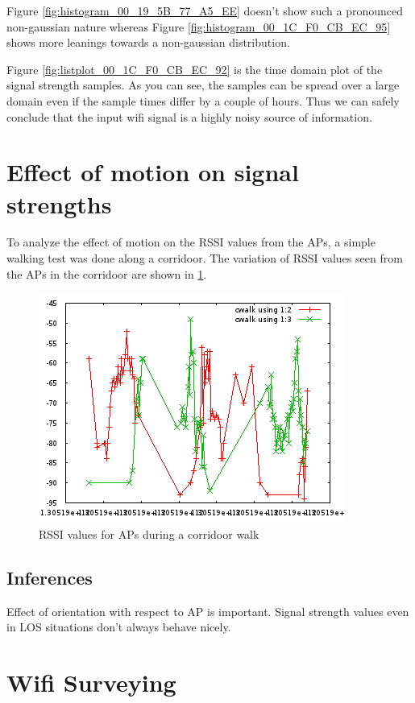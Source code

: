 Figure \ref{fig:histogram_00_19_5B_77_A5_EE} doesn't show such a pronounced non-gaussian
nature whereas Figure \ref{fig:histogram_00_1C_F0_CB_EC_95} shows more leanings towards a
non-gaussian distribution.

Figure \ref{fig:listplot_00_1C_F0_CB_EC_92} is the time domain plot of the signal strength
samples. As you can see, the samples can be spread over a large domain even if the 
sample times differ by a couple of hours. Thus we can safely conclude that the 
input wifi signal is a highly noisy source of information.

\section{Effect of motion on signal strengths}

To analyze the effect of motion on the RSSI values from the APs, a simple walking
test was done along a corridoor. The variation of RSSI values seen from the APs in
the corridoor are shown in \ref{fig:wifi_corridoor_walk}.

\begin{figure}\centering
    \includegraphics{figures/wifi_corridoor_walk.png}
    \caption{RSSI values for APs during a corridoor walk \label{fig:wifi_corridoor_walk}}
\end{figure}


\subsection{Inferences}
Effect of orientation with respect to AP is important. Signal strength values
even in LOS situations don't always behave nicely.

\section{Wifi Surveying}

